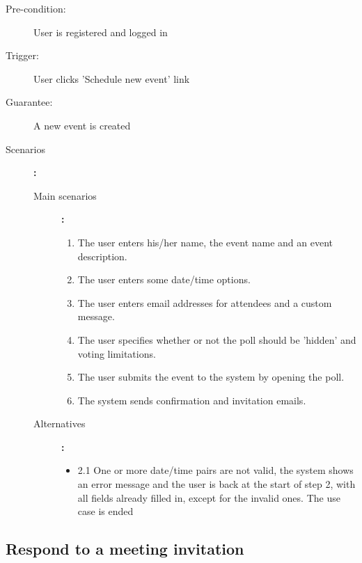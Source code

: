 \begin{description}
	\item[Pre-condition:] User is registered and logged in
	\item[Trigger:] User clicks 'Schedule new event' link
	\item[Guarantee:] A new event is created
	\item[Scenarios]\textbf{:}\\
				\begin{description}
					\item[Main scenarios]\textbf{:}\\
								\begin{enumerate}
									\item The user enters his/her name, the event name and an event description.
									\item The user enters some date/time options.
									\item The user enters email addresses for attendees and a custom message.
									\item The user specifies whether or not the poll should be 'hidden' and voting limitations.
									\item The user submits the event to the system by opening the poll.
									\item The system sends confirmation and invitation emails.
								\end{enumerate}
					\item[Alternatives]\textbf{:}\\
								\begin{itemize}
									\item 2.1 One or more date/time pairs are not valid, the system shows an error message and the user is back at the start of step 2, with all fields already filled in, except for the invalid ones. The use case is ended
								\end{itemize}
				\end{description}
\end{description}


\subsection{Respond to a meeting invitation}


